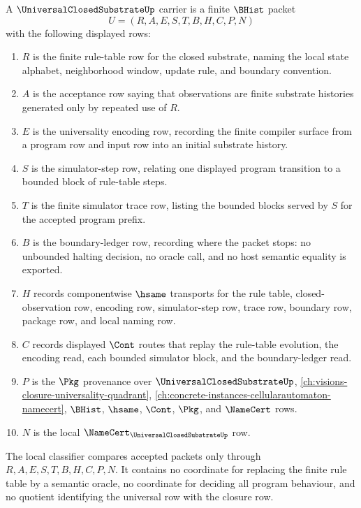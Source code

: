 \begin{definition}
\label{def:universal-closed-substrate-carrier}
A $\UniversalClosedSubstrateUp$ carrier is a finite $\BHist$ packet
$$
U=(R,A,E,S,T,B,H,C,P,N)
$$
with the following displayed rows:
\begin{enumerate}
\item $R$ is the finite rule-table row for the closed substrate, naming the local state alphabet, neighborhood window, update rule, and boundary convention.
\item $A$ is the acceptance row saying that observations are finite substrate histories generated only by repeated use of $R$.
\item $E$ is the universality encoding row, recording the finite compiler surface from a program row and input row into an initial substrate history.
\item $S$ is the simulator-step row, relating one displayed program transition to a bounded block of rule-table steps.
\item $T$ is the finite simulator trace row, listing the bounded blocks served by $S$ for the accepted program prefix.
\item $B$ is the boundary-ledger row, recording where the packet stops: no unbounded halting decision, no oracle call, and no host semantic equality is exported.
\item $H$ records componentwise $\hsame$ transports for the rule table, closed-observation row, encoding row, simulator-step row, trace row, boundary row, package row, and local naming row.
\item $C$ records displayed $\Cont$ routes that replay the rule-table evolution, the encoding read, each bounded simulator block, and the boundary-ledger read.
\item $P$ is the $\Pkg$ provenance over $\UniversalClosedSubstrateUp$, \autoref{ch:visions-closure-universality-quadrant}, \autoref{ch:concrete-instances-cellularautomaton-namecert}, $\BHist$, $\hsame$, $\Cont$, $\Pkg$, and $\NameCert$ rows.
\item $N$ is the local $\NameCert_{\UniversalClosedSubstrateUp}$ row.
\end{enumerate}
The local classifier compares accepted packets only through $R,A,E,S,T,B,H,C,P,N$. It contains no coordinate for replacing the finite rule table by a semantic oracle, no coordinate for deciding all program behaviour, and no quotient identifying the universal row with the closure row.
\end{definition}

